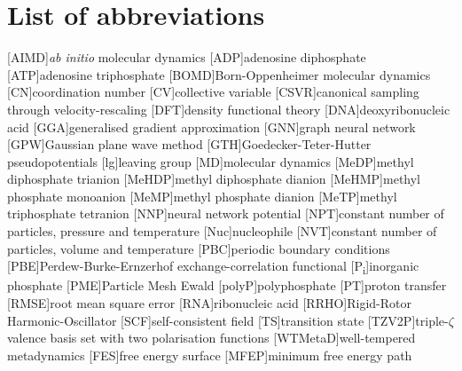\chapter*{List of abbreviations}

\begin{acronym}
    [AIMD]{\textit{ab initio} molecular dynamics}
    [ADP]{adenosine diphosphate}
    [ATP]{adenosine triphosphate}
    [BOMD]{Born-Oppenheimer molecular dynamics}
    [CN]{coordination number}
    [CV]{collective variable}
    [CSVR]{canonical sampling through velocity-rescaling}
    [DFT]{density functional theory}
    [DNA]{deoxyribonucleic acid}
    [GGA]{generalised gradient approximation}
    [GNN]{graph neural network}
    [GPW]{Gaussian plane wave method}
    [GTH]{Goedecker-Teter-Hutter pseudopotentials}
    [lg]{leaving group}
    [MD]{molecular dynamics}
    [MeDP]{methyl diphosphate trianion}
    [MeHDP]{methyl diphosphate dianion}
    [MeHMP]{methyl phosphate monoanion}
    [MeMP]{methyl phosphate dianion}
    [MeTP]{methyl triphosphate tetranion}
    [NNP]{neural network potential}
    [NPT]{constant number of particles, pressure and temperature}
    [Nuc]{nucleophile}
    [NVT]{constant number of particles, volume and temperature}
    [PBC]{periodic boundary conditions}
    [PBE]{Perdew-Burke-Ernzerhof exchange-correlation functional}
    [P\textsubscript{i}]{inorganic phosphate}
    [PME]{Particle Mesh Ewald}
    [polyP]{polyphosphate}
    [PT]{proton transfer}
    [RMSE]{root mean square error}
    [RNA]{ribonucleic acid}
    [RRHO]{Rigid-Rotor Harmonic-Oscillator}
    [SCF]{self-consistent field}
    [TS]{transition state}
    [TZV2P]{triple-$\zeta$ valence basis set with two polarisation functions}
    [WTMetaD]{well-tempered metadynamics}
    [FES]{free energy surface}
    [MFEP]{minimum free energy path}
\end{acronym}


